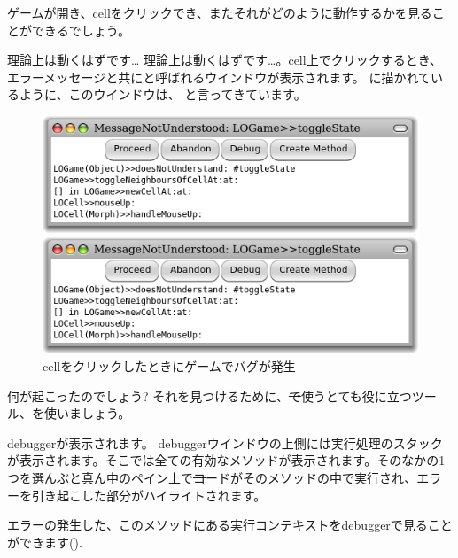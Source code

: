 \documentclass[a4paper,10pt,twoside]{book}
\begin{document}

ゲームが開き、cellをクリックでき、またそれがどのように動作するかを見ることができるでしょう。

理論上は動くはずです\ldots{}
理論上は動くはずです…。cell上でクリックするとき、エラーメッセージと共にと呼ばれるウインドウが表示されます。 に描かれているように、このウインドウは、 と言ってきています。

\begin{figure}[ht]
\ifluluelse
	{\centerline{\includegraphics[width=\textwidth]{Error}}}
	{\centerline{\includegraphics[scale=0.7]{Error}}}
\caption{cellをクリックしたときにゲームでバグが発生
}
\end{figure}

\noindent
何が起こったのでしょう? それを見つけるために、\st で使うとても役に立つツール、を使いましょう。

debuggerが表示されます。
debuggerウインドウの上側には実行処理のスタックが表示されます。そこでは全ての有効なメソッドが表示されます。そのなかの1つを選んぶと真ん中のペイン上で\st コードがそのメソッドの中で実行され、エラーを引き起こした部分がハイライトされます。

エラーの発生した、このメソッドにある実行コンテキストをdebuggerで見ることができます().
\end{document}

